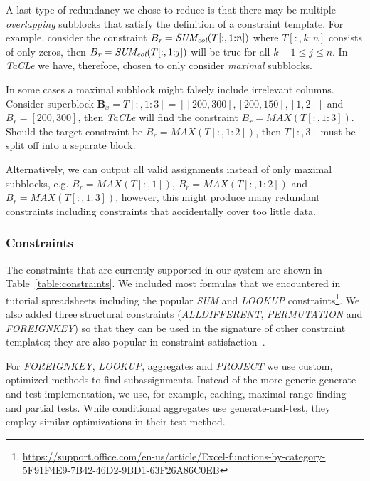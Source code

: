 \documentclass{IEEEtran}
\newcommand{\format}[1]{\textit{#1}\xspace}
\newcommand{\sname}{\format{TaCLe}}
\newcommand{\range}[3]{\ensuremath{#1[#2,#3]}}
\newcommand{\rangeto}[2]{#1{:}#2}
\newcommand{\rangeall}{:}
\newcommand{\eccalc}[2]{\ensuremath{#1 = #2}}
\newcommand{\ecsumc}[2]{\eccalc{#1}{\textit{SUM\textsubscript{col}}(#2)}}
\newcommand{\sbs}{B}
\newcommand{\sbl}[1]{\ensuremath{\sbs_{\textit{#1}}}}
\newcommand{\bsbl}[1]{\ensuremath{\mathbf{\sbs_{\textit{#1}}}}}
\theoremstyle{definition}
\begin{document}
A last type of redundancy we chose to reduce is that there may be multiple \textit{overlapping} subblocks that satisfy the definition of a constraint template.
For example, consider the constraint $\ecsumc{\sbl{r}}{\range{T}{\rangeall}{\rangeto{1}{n}}}$ where $\range{T}{\rangeall}{\rangeto{k}{n}}$ consists of only zeros, then $\ecsumc{\sbl{r}}{\range{T}{\rangeall}{\rangeto{1}{j}}}$ will be true for all $k - 1 \leq j \leq n$.
In \sname we have, therefore, chosen to only consider \textit{maximal} subblocks.

In some cases a maximal subblock might falsely include irrelevant columns.
Consider superblock $\bsbl{x} = \range{T}{\rangeall}{\rangeto{1}{3}} = [[200, 300], [200, 150], [1, 2]]$ and $\sbl{r} = [200, 300]$, then \sname will find the constraint $\eccalc{\sbl{r}}{\textit{MAX}(\range{T}{\rangeall}{\rangeto{1}{3}})}$.
Should the target constraint be $\eccalc{\sbl{r}}{\textit{MAX}(\range{T}{\rangeall}{\rangeto{1}{2}})}$, then $\range{T}{\rangeall}{3}$ must be split off into a separate block.

Alternatively, we can output all valid assignments instead of only maximal subblocks, e.g. $\eccalc{\sbl{r}}{\textit{MAX}(\range{T}{\rangeall}{1})}$, $\eccalc{\sbl{r}}{\textit{MAX}(\range{T}{\rangeall}{\rangeto{1}{2}})}$ and $\eccalc{\sbl{r}}{\textit{MAX}(\range{T}{\rangeall}{\rangeto{1}{3}})}$, however, this might produce many redundant constraints including constraints that accidentally cover too little data.





\subsubsection{Constraints}
The constraints that are currently supported in our system are shown in Table~\ref{table:constraints}.
We included most formulas that we encountered in tutorial spreadsheets including the popular \textit{SUM} and \textit{LOOKUP} constraints\footnote{\href{https://support.office.com/en-us/article/Excel-functions-by-category-5F91F4E9-7B42-46D2-9BD1-63F26A86C0EB}{https://support.office.com/en-us/article/Excel-functions-by-category-5F91F4E9-7B42-46D2-9BD1-63F26A86C0EB}}.
We also added three structural constraints (\textit{ALLDIFFERENT}, \textit{PERMUTATION} and \textit{FOREIGNKEY}) so that they can be used in the signature of other constraint templates; they are also popular in constraint satisfaction~\cite{modelseeker}.

For \textit{FOREIGNKEY}, \textit{LOOKUP}, aggregates and \textit{PROJECT} we use custom, optimized methods to find subassignments.
Instead of the more generic generate-and-test implementation, we use, for example, caching, maximal range-finding and partial tests.
While conditional aggregates use generate-and-test, they employ similar optimizations in their test method.
\end{document}

